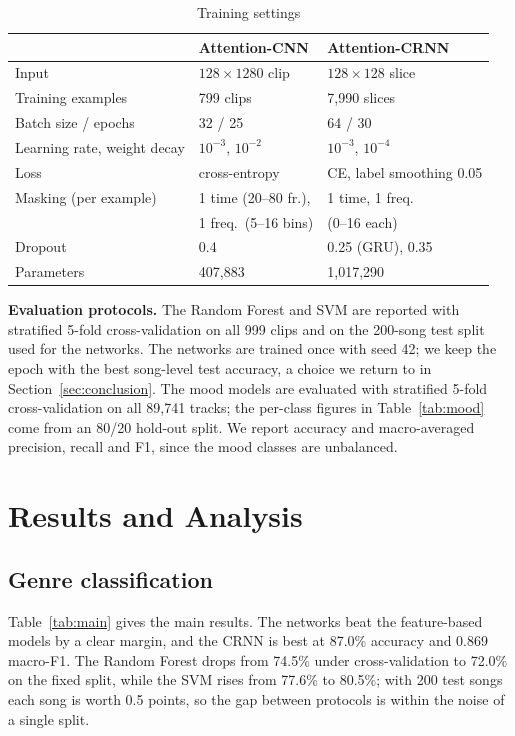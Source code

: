 \documentclass[conference]{IEEEtran}
\begin{document}
\begin{table}[t]
\caption{Training settings}
\label{tab:settings}
\centering
\setlength{\tabcolsep}{4pt}
\begin{tabular}{@{}lll@{}}
\toprule
 & Attention-CNN & Attention-CRNN\\
\midrule
Input & $128\times1280$ clip & $128\times128$ slice\\
Training examples & 799 clips & 7{,}990 slices\\
Batch size / epochs & 32 / 25 & 64 / 30\\
Learning rate, weight decay & $10^{-3}$, $10^{-2}$ & $10^{-3}$, $10^{-4}$\\
Loss & cross-entropy & CE, label smoothing 0.05\\
Masking (per example) & 1 time (20--80 fr.), & 1 time, 1 freq.\\
 & 1 freq.\ (5--16 bins) & (0--16 each)\\
Dropout & 0.4 & 0.25 (GRU), 0.35\\
Parameters & 407{,}883 & 1{,}017{,}290\\
\bottomrule
\end{tabular}
\end{table}

\textbf{Evaluation protocols.} The Random Forest and SVM are reported with stratified 5-fold cross-validation on all 999 clips and on the 200-song test split used for the networks. The networks are trained once with seed 42; we keep the epoch with the best song-level test accuracy, a choice we return to in Section~\ref{sec:conclusion}. The mood models are evaluated with stratified 5-fold cross-validation on all 89{,}741 tracks; the per-class figures in Table~\ref{tab:mood} come from an 80/20 hold-out split. We report accuracy and macro-averaged precision, recall and F1, since the mood classes are unbalanced.

\section{Results and Analysis}

\subsection{Genre classification}
Table~\ref{tab:main} gives the main results. The networks beat the feature-based models by a clear margin, and the CRNN is best at 87.0\% accuracy and 0.869 macro-F1. The Random Forest drops from 74.5\% under cross-validation to 72.0\% on the fixed split, while the SVM rises from 77.6\% to 80.5\%; with 200 test songs each song is worth 0.5 points, so the gap between protocols is within the noise of a single split.
\end{document}

